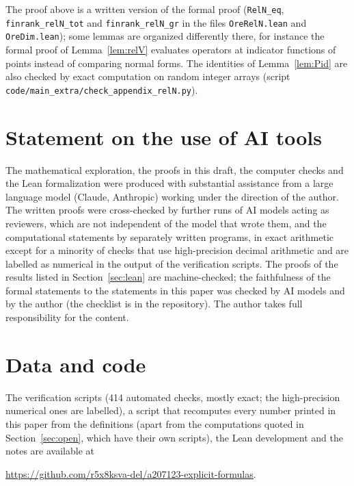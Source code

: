 \documentclass[11pt]{amsart}
\theoremstyle{definition}
\newcommand{\lean}[1]{\texttt{#1}}
\begin{document}
The proof above is a written version of the formal proof (\lean{RelN\_eq}, \lean{finrank\_relN\_tot} and \lean{finrank\_relN\_gr} in the files \lean{OreRelN.lean} and \lean{OreDim.lean}); some lemmas are organized differently there, for instance the formal proof of Lemma~\ref{lem:relV} evaluates operators at indicator functions of points instead of comparing normal forms. The identities of Lemma~\ref{lem:Pid} are also checked by exact computation on random integer arrays (script \lean{code/main\_extra/check\_appendix\_relN.py}).

\section*{Statement on the use of AI tools}
The mathematical exploration, the proofs in this draft, the computer checks and the Lean formalization were produced with substantial assistance from a large language model (Claude, Anthropic) working under the direction of the author. The written proofs were cross-checked by further runs of AI models acting as reviewers, which are not independent of the model that wrote them, and the computational statements by separately written programs, in exact arithmetic except for a minority of checks that use high-precision decimal arithmetic and are labelled as numerical in the output of the verification scripts. The proofs of the results listed in Section~\ref{sec:lean} are machine-checked; the faithfulness of the formal statements to the statements in this paper was checked by AI models and by the author (the checklist is in the repository). The author takes full responsibility for the content.

\section*{Data and code}
The verification scripts (414 automated checks, mostly exact; the high-precision numerical ones are labelled), a script that recomputes every number printed in this paper from the definitions (apart from the computations quoted in Section~\ref{sec:open}, which have their own scripts), the Lean development and the notes are available at
\begin{center}
\url{https://github.com/r5x8ksva-del/a207123-explicit-formulas}.
\end{center}
\end{document}
